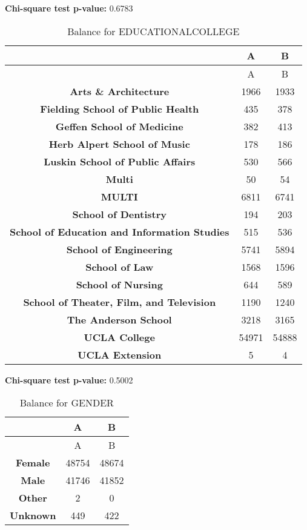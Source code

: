 \documentclass[
]{article}
\begin{document}
\textbf{Chi-square test p-value:} 0.6783\\
\pagebreak

\begin{longtable}[]{@{}ccc@{}}
\caption{Balance for EDUCATIONALCOLLEGE}\tabularnewline
\toprule\noalign{}
~ & A & B \\
\midrule\noalign{}
\endfirsthead
\toprule\noalign{}
~ & A & B \\
\midrule\noalign{}
\endhead
\bottomrule\noalign{}
\endlastfoot
\textbf{Arts \& Architecture} & 1966 & 1933 \\
\textbf{Fielding School of Public Health} & 435 & 378 \\
\textbf{Geffen School of Medicine} & 382 & 413 \\
\textbf{Herb Alpert School of Music} & 178 & 186 \\
\textbf{Luskin School of Public Affairs} & 530 & 566 \\
\textbf{Multi} & 50 & 54 \\
\textbf{MULTI} & 6811 & 6741 \\
\textbf{School of Dentistry} & 194 & 203 \\
\textbf{School of Education and Information Studies} & 515 & 536 \\
\textbf{School of Engineering} & 5741 & 5894 \\
\textbf{School of Law} & 1568 & 1596 \\
\textbf{School of Nursing} & 644 & 589 \\
\textbf{School of Theater, Film, and Television} & 1190 & 1240 \\
\textbf{The Anderson School} & 3218 & 3165 \\
\textbf{UCLA College} & 54971 & 54888 \\
\textbf{UCLA Extension} & 5 & 4 \\
\end{longtable}

\textbf{Chi-square test p-value:} 0.5002\\
\pagebreak

\begin{longtable}[]{@{}ccc@{}}
\caption{Balance for GENDER}\tabularnewline
\toprule\noalign{}
~ & A & B \\
\midrule\noalign{}
\endfirsthead
\toprule\noalign{}
~ & A & B \\
\midrule\noalign{}
\endhead
\bottomrule\noalign{}
\endlastfoot
\textbf{Female} & 48754 & 48674 \\
\textbf{Male} & 41746 & 41852 \\
\textbf{Other} & 2 & 0 \\
\textbf{Unknown} & 449 & 422 \\
\end{longtable}
\end{document}
